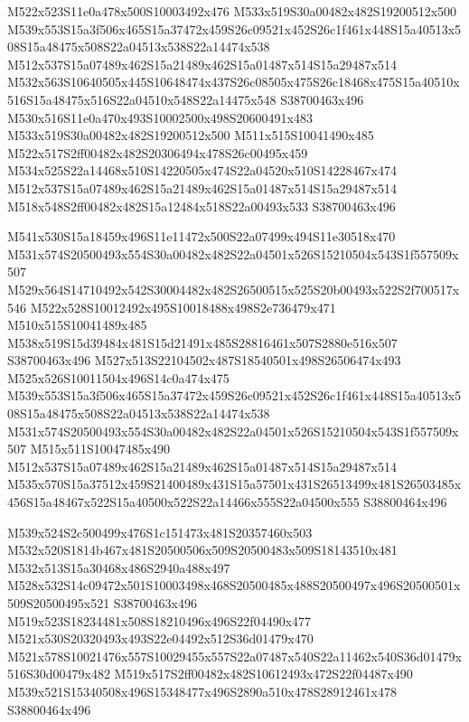 \documentclass{article}
\begin{document}
\begin{multicols}{2}
M522x523S11e0a478x500S10003492x476 M533x519S30a00482x482S19200512x500 M539x553S15a3f506x465S15a37472x459S26c09521x452S26c1f461x448S15a40513x508S15a48475x508S22a04513x538S22a14474x538 M512x537S15a07489x462S15a21489x462S15a01487x514S15a29487x514 M532x563S10640505x445S10648474x437S26c08505x475S26c18468x475S15a40510x516S15a48475x516S22a04510x548S22a14475x548 S38700463x496 M530x516S11e0a470x493S10002500x498S20600491x483 M533x519S30a00482x482S19200512x500 M511x515S10041490x485 M522x517S2ff00482x482S20306494x478S26c00495x459 M534x525S22a14468x510S14220505x474S22a04520x510S14228467x474 M512x537S15a07489x462S15a21489x462S15a01487x514S15a29487x514 M518x548S2ff00482x482S15a12484x518S22a00493x533 S38700463x496

M541x530S15a18459x496S11e11472x500S22a07499x494S11e30518x470 M531x574S20500493x554S30a00482x482S22a04501x526S15210504x543S1f557509x507 M529x564S14710492x542S30004482x482S26500515x525S20b00493x522S2f700517x546 M522x528S10012492x495S10018488x498S2e736479x471 M510x515S10041489x485 M538x519S15d39484x481S15d21491x485S28816461x507S2880e516x507 S38700463x496 M527x513S22104502x487S18540501x498S26506474x493 M525x526S10011504x496S14c0a474x475 M539x553S15a3f506x465S15a37472x459S26c09521x452S26c1f461x448S15a40513x508S15a48475x508S22a04513x538S22a14474x538 M531x574S20500493x554S30a00482x482S22a04501x526S15210504x543S1f557509x507 M515x511S10047485x490 M512x537S15a07489x462S15a21489x462S15a01487x514S15a29487x514 M535x570S15a37512x459S21400489x431S15a57501x431S26513499x481S26503485x456S15a48467x522S15a40500x522S22a14466x555S22a04500x555 S38800464x496

M539x524S2c500499x476S1c151473x481S20357460x503 M532x520S1814b467x481S20500506x509S20500483x509S18143510x481 M532x513S15a30468x486S2940a488x497 M528x532S14c09472x501S10003498x468S20500485x488S20500497x496S20500501x509S20500495x521 S38700463x496 M519x523S18234481x508S18210496x496S22f04490x477 M521x530S20320493x493S22e04492x512S36d01479x470 M521x578S10021476x557S10029455x557S22a07487x540S22a11462x540S36d01479x516S30d00479x482 M519x517S2ff00482x482S10612493x472S22f04487x490 M539x521S15340508x496S15348477x496S2890a510x478S28912461x478 S38800464x496


\end{multicols}
\end{document}
